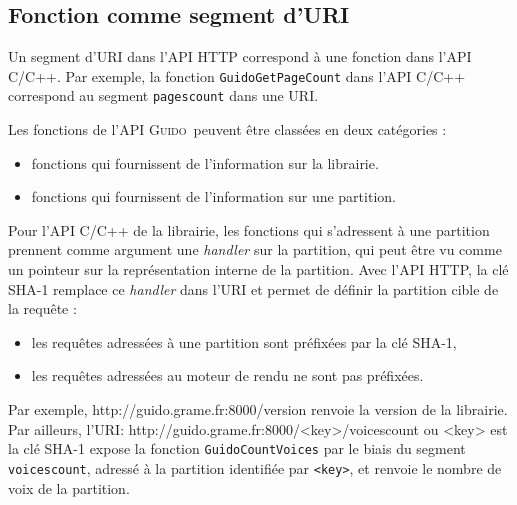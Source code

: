 \documentclass{article}
\newenvironment{code}		{\vspace{-2mm} \fontsize{8.5pt}{12pt}\selectfont \verbatim}{\endverbatim\vspace{-2mm}}
\newcommand{\guido}		{\textsc{Guido}}
\begin{document}
\subsection{Fonction comme segment d'URI}
Un segment d'URI dans l'API HTTP correspond à une fonction dans l'API C/C++. Par exemple, la fonction \verb=GuidoGetPageCount= dans l'API C/C++ correspond au segment \verb=pagescount= dans une URI.

Les fonctions de l'API \guido\ peuvent être classées en deux catégories :
\begin{itemize}[noitemsep]
\item fonctions qui fournissent de l'information sur la librairie.
\item fonctions qui fournissent de l'information sur une partition.
\end{itemize}

Pour l'API C/C++ de la librairie, les fonctions qui s'adressent à une partition prennent comme argument une \emph{handler} sur la partition, qui peut être vu comme un pointeur sur la représentation interne de la partition. Avec l'API HTTP, la clé SHA-1 remplace ce \emph{handler} dans l'URI et permet de définir la partition cible de la requête :
\begin{itemize}[noitemsep]
\item les requêtes adressées à une partition sont préfixées par la clé SHA-1,
\item les requêtes adressées au moteur de rendu ne sont pas préfixées.
\end{itemize}
Par exemple,
\begin{code}
  http://guido.grame.fr:8000/version
\end{code}
renvoie la version de la librairie. \\
Par ailleurs, l'URI:
\begin{code}
  http://guido.grame.fr:8000/<key>/voicescount
         ou <key> est la clé SHA-1
\end{code}
expose la fonction \verb=GuidoCountVoices= par le biais du segment \verb=voicescount=, adressé à la partition identifiée par \verb=<key>=, et renvoie le nombre de voix de la partition.
\end{document}
